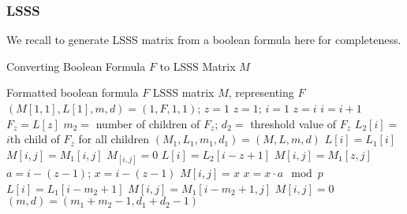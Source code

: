 \subsubsection{LSSS}\label{sec:lsss}
We recall \cite[Algorithm 1]{LiuC10} to generate LSSS matrix from a boolean formula here for completeness.
\begin{algorithm}
\caption{Converting Boolean Formula $F$ to LSSS Matrix $M$}
\label{alg:lsssM}
\begin{algorithmic}[1]
\REQUIRE Formatted boolean formula $F$
\ENSURE LSSS matrix $M$, representing $F$
\STATE $(M[1,1], L[1], m, d) = (1, F, 1, 1)$; $z = 1$
  \STATE $z = 1$; $i = 1$
      \STATE $z = i$
    \ENDIF 
    \STATE $i = i+1$
  \ENDWHILE
    \STATE $F_z = L[z]$
    \STATE $m_2 =$ number of children of $F_z$; $d_2 =$ threshold value of $F_z$
    \STATE $L_{2}[i] =$ $i$th child of $F_z$ for all children
    \STATE $(M_1, L_1, m_1, d_1) = (M, L, m, d)$
      \STATE $L[i] = L_{1}[i]$
        \STATE $M[i,j] = M_{1}[i,j]$
      \ENDFOR
        \STATE $M_[i,j] = 0$
      \ENDFOR
    \ENDFOR
      \STATE $L[i] = L_{2}[i-z+1]$
        \STATE $M[i,j] = M_{1}[z,j]$
      \ENDFOR
      \STATE $a = i - (z-1)$; $x = i - (z-1)$
        \STATE $M[i,j] = x$
        \STATE $x = x \cdot a \mod p$
      \ENDFOR
    \ENDFOR
      \STATE $L[i] = L_{1}[i-m_2+1]$
        \STATE $M[i,j] = M_{1}[i-m_2+1, j]$
      \ENDFOR
        \STATE $M[i,j] = 0$
      \ENDFOR
    \ENDFOR
    \STATE $(m, d) = (m_1 + m_2 - 1, d_1 + d_2 - 1)$
  \ENDIF
\ENDWHILE
\end{algorithmic}
\end{algorithm}

